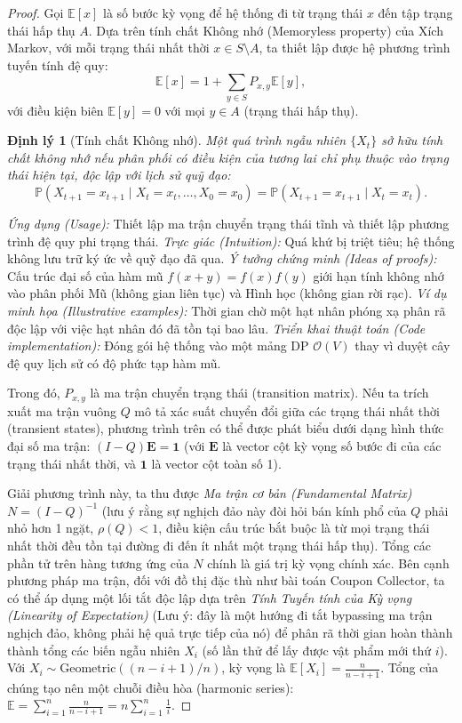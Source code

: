 \documentclass{article}
\newtheorem{dinhly}{Định lý}
\begin{document}
\begin{proof}
Gọi $\mathbb{E}[x]$ là số bước kỳ vọng để hệ thống đi từ trạng thái $x$ đến tập trạng thái hấp thụ $A$. Dựa trên tính chất Không nhớ (Memoryless property) của Xích Markov, với mỗi trạng thái nhất thời $x \in S \setminus A$, ta thiết lập được hệ phương trình tuyến tính đệ quy:
\begin{equation*}
 \mathbb{E}[x] = 1 + \sum_{y \in S} P_{x,y} \mathbb{E}[y],
\end{equation*}
với điều kiện biên $\mathbb{E}[y] = 0$ với mọi $y \in A$ (trạng thái hấp thụ).

\begin{dinhly}[Tính chất Không nhớ]
Một quá trình ngẫu nhiên $\{X_t\}$ sở hữu tính chất không nhớ nếu phân phối có điều kiện của tương lai chỉ phụ thuộc vào trạng thái hiện tại, độc lập với lịch sử quỹ đạo:
$$ \mathbb{P}(X_{t+1} = x_{t+1} \mid X_t = x_t, \dots, X_0 = x_0) = \mathbb{P}(X_{t+1} = x_{t+1} \mid X_t = x_t). $$
\end{dinhly}
\emph{Ứng dụng (Usage):} Thiết lập ma trận chuyển trạng thái tĩnh và thiết lập phương trình đệ quy phi trạng thái.
\emph{Trực giác (Intuition):} Quá khứ bị triệt tiêu; hệ thống không lưu trữ ký ức về quỹ đạo đã qua.
\emph{Ý tưởng chứng minh (Ideas of proofs):} Cấu trúc đại số của hàm mũ $f(x+y)=f(x)f(y)$ giới hạn tính không nhớ vào phân phối Mũ (không gian liên tục) và Hình học (không gian rời rạc).
\emph{Ví dụ minh họa (Illustrative examples):} Thời gian chờ một hạt nhân phóng xạ phân rã độc lập với việc hạt nhân đó đã tồn tại bao lâu.
\emph{Triển khai thuật toán (Code implementation):} Đóng gói hệ thống vào một mảng DP $\mathcal{O}(V)$ thay vì duyệt cây đệ quy lịch sử có độ phức tạp hàm mũ.

Trong đó, $P_{x,y}$ là ma trận chuyển trạng thái (transition matrix). Nếu ta trích xuất ma trận vuông $Q$ mô tả xác suất chuyển đổi giữa các trạng thái nhất thời (transient states), phương trình trên có thể được phát biểu dưới dạng hình thức đại số ma trận: $(I - Q)\mathbf{E} = \mathbf{1}$ (với $\mathbf{E}$ là vector cột kỳ vọng số bước đi của các trạng thái nhất thời, và $\mathbf{1}$ là vector cột toàn số 1). 

Giải phương trình này, ta thu được \textit{Ma trận cơ bản (Fundamental Matrix)} $N = (I - Q)^{-1}$ (lưu ý rằng sự nghịch đảo này đòi hỏi bán kính phổ của $Q$ phải nhỏ hơn 1 ngặt, $\rho(Q) < 1$, điều kiện cấu trúc bắt buộc là từ mọi trạng thái nhất thời đều tồn tại đường đi đến ít nhất một trạng thái hấp thụ). Tổng các phần tử trên hàng tương ứng của $N$ chính là giá trị kỳ vọng chính xác. Bên cạnh phương pháp ma trận, đối với đồ thị đặc thù như bài toán Coupon Collector, ta có thể áp dụng một lối tắt độc lập dựa trên \textit{Tính Tuyến tính của Kỳ vọng (Linearity of Expectation)} (Lưu ý: đây là một hướng đi tắt bypassing ma trận nghịch đảo, không phải hệ quả trực tiếp của nó) để phân rã thời gian hoàn thành thành tổng các biến ngẫu nhiên $X_i$ (số lần thử để lấy được vật phẩm mới thứ $i$). Với $X_i \sim \text{Geometric}((n-i+1)/n)$, kỳ vọng là $\mathbb{E}[X_i] = \frac{n}{n-i+1}$. Tổng của chúng tạo nên một chuỗi điều hòa (harmonic series): $\mathbb{E} = \sum_{i=1}^n \frac{n}{n-i+1} = n \sum_{i=1}^n \frac{1}{i}$.


\end{proof}
\end{document}
